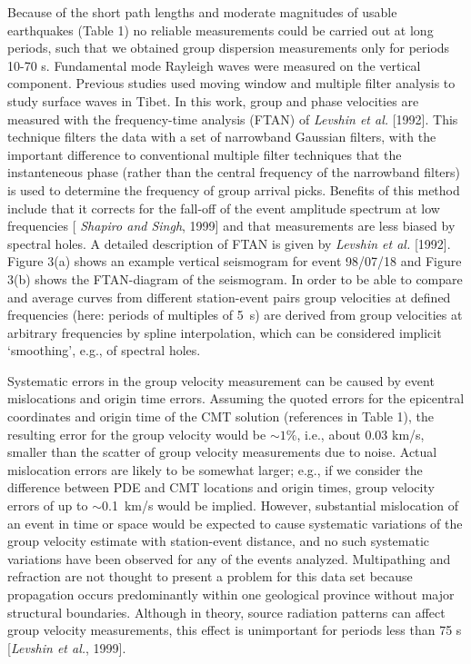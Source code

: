 \documentclass[12pt]{article}
\begin{document}
Because of the short path lengths and moderate magnitudes of usable earthquakes (Table 1) no reliable
measurements could be carried out at long periods, such that we obtained group dispersion measurements
only for periods 10-70 s.  Fundamental mode Rayleigh waves were measured on the vertical component. Previous
studies used moving window and multiple filter analysis to study surface waves in Tibet.  In this work,
group and phase velocities are measured with the frequency-time analysis (FTAN) of {\it Levshin et al.}
[1992].  This technique filters the data with a set of narrowband
Gaussian filters, with the important difference to conventional
multiple filter techniques that the instanteneous phase (rather than
the central frequency of the narrowband filters) is used to
determine the frequency of group arrival picks.  Benefits of this
method include that it corrects for the fall-off of the event amplitude spectrum at low frequencies [{\it
Shapiro and Singh}, 1999] and that measurements are less biased by
spectral holes.  A detailed description of FTAN is given by {\it Levshin et al.} [1992].  Figure
3(a) shows an example vertical seismogram for event 98/07/18 and Figure 3(b) shows the FTAN-diagram of the
seismogram.  In order to be able to compare and average curves
from different station-event pairs group velocities at defined
frequencies (here: periods of multiples of 5~s) are derived from group
velocities at arbitrary frequencies by spline interpolation, which can
be considered implicit `smoothing', e.g., of spectral holes.

Systematic errors in the group velocity measurement can be caused by event mislocations and origin time
errors.  Assuming the quoted errors for the epicentral coordinates and
origin time of the CMT solution (references in Table 1), the
resulting error for the group velocity would be $\sim1\%$, i.e., about 0.03 km/s, smaller than the scatter
of group velocity measurements due to noise.  Actual mislocation errors are
likely to be somewhat larger; e.g., if we consider the difference
between PDE and CMT locations and origin times, group velocity errors
of up to $\sim$0.1~km/s would be implied.  However, substantial mislocation of an event in time or
space would be expected to cause systematic variations of the group velocity estimate with station-event
distance, and no such systematic variations have been observed for any of the events analyzed.
Multipathing and refraction are not thought to present a problem for this data set because propagation
occurs predominantly within one geological province without major structural boundaries. Although in
theory, source radiation patterns can affect group velocity measurements, this effect is unimportant for
periods less than 75 s [{\it Levshin et al.}, 1999].
\end{document}
